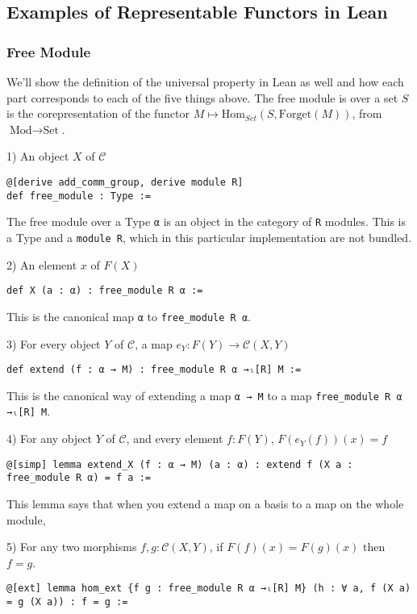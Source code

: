 \documentclass[12pt]{article} %
\theoremstyle{definition}
\theoremstyle{definition}
\theoremstyle{definition}
\theoremstyle{definition}
\begin{document}
\subsection{Examples of Representable Functors in Lean}

\subsubsection{Free Module}
We'll show the definition of the universal property in Lean as well and how each part corresponds to each
of the five things above. The free module is over a set $S$ is the corepresentation of the functor 
$M \mapsto \text{Hom}_{Set}(S, \text{Forget}(M))$, from $\text{Mod} \to \text{Set}$.

1) An object $X$ of $\mathcal{C}$
\begin{lstlisting}
@[derive add_comm_group, derive module R]
def free_module : Type :=
\end{lstlisting}
The free module over a Type \lstinline{α} is an object in the category of \lstinline{R}
modules. This is a Type and a \lstinline{module R}, which in this particular implementation
are not bundled.


2) An element $x$ of $F(X)$
\begin{lstlisting}
def X (a : α) : free_module R α :=
\end{lstlisting}
This is the canonical map \lstinline{α} to \lstinline{free_module R α}.

3) For every object $Y$ of $\mathcal{C}$, a map $e_Y : F(Y) \to \mathcal{C}(X, Y)$
\begin{lstlisting}
def extend (f : α → M) : free_module R α →ₗ[R] M :=
\end{lstlisting}
This is the canonical way of extending a map \lstinline{α → M} to a map 
\lstinline{free_module R α →ₗ[R] M}.

4) For any object $Y$ of $\mathcal{C}$, and every element $f : F(Y)$, $F(e_Y(f))(x) = f$
\begin{lstlisting}
@[simp] lemma extend_X (f : α → M) (a : α) : extend f (X a : free_module R α) = f a :=
\end{lstlisting}
This lemma says that when you extend a map on a basis to a map on the whole module,

5) For any two morphisms $f, g : \mathcal{C}(X, Y)$, if $F(f)(x) = F(g)(x)$ then $f = g$.
\begin{lstlisting}
@[ext] lemma hom_ext {f g : free_module R α →ₗ[R] M} (h : ∀ a, f (X a) = g (X a)) : f = g :=
\end{lstlisting}
\end{document}
